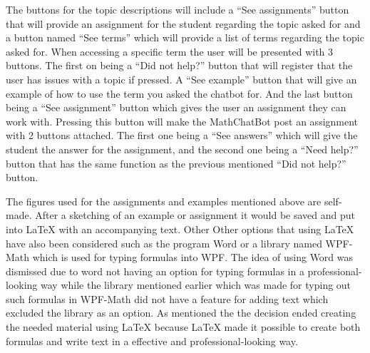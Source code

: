 The buttons for the topic descriptions will include a \enquote{See assignments} button that will provide an assignment for the student regarding the topic asked for and a button named \enquote{See terms} which will provide a list of terms regarding the topic asked for. When accessing a specific term the user will be presented with 3 buttons. The first on being a \enquote{Did not help?} button that will register that the user has issues with a topic if pressed. A \enquote{See example} button that will give an example of how to use the term you asked the chatbot for. And the last button being a \enquote{See assignment} button which gives the user an assignment they can work with. Pressing this button will make the MathChatBot post an assignment with 2 buttons attached. The first one being a \enquote{See answers} which will give the student the answer for the assignment, and the second one being a \enquote{Need help?} button that has the same function as the previous mentioned \enquote{Did not help?} button. \newline

The figures used for the assignments and examples mentioned above are self-made. After a sketching of an example or assignment it would be saved and put into LaTeX with an accompanying text. Other Other options that using LaTeX have also been considered such as the program Word or a library named WPF-Math which is used for typing formulas into WPF. The idea of using Word was dismissed due to word not having an option for typing formulas in a professional-looking way while the library mentioned earlier which was made for typing out such formulas in WPF-Math did not have a feature for adding text which excluded the library as an option. As mentioned the the decision ended creating the needed material using LaTeX  because LaTeX made it possible to create both formulas and write text in a effective and professional-looking way.
